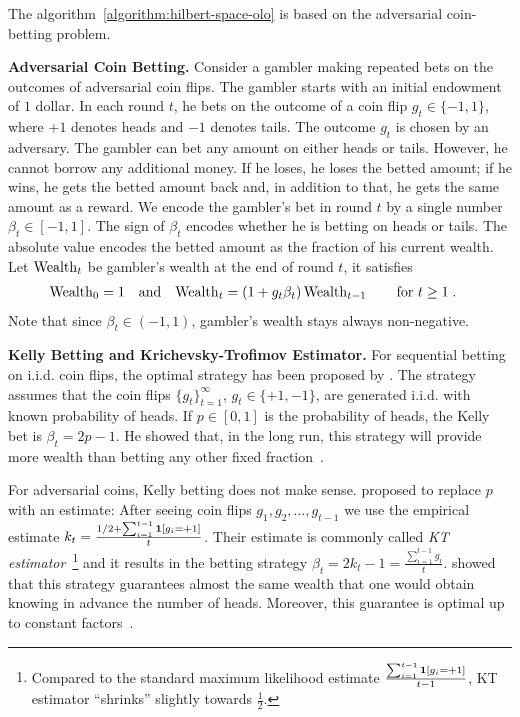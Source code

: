 
The algorithm~\ref{algorithm:hilbert-space-olo} is based on the adversarial coin-betting problem.

\textbf{Adversarial Coin Betting.}
Consider a gambler making
repeated bets on the outcomes of adversarial coin flips. The gambler starts with an
initial endowment of $1$ dollar. In each round $t$, he bets on the outcome of a
coin flip $g_t \in \{-1,1\}$, where $+1$ denotes heads and $-1$ denotes tails.
The outcome $g_t$ is chosen by an adversary.
The gambler can bet any amount on either heads or tails. However, he cannot borrow
any additional money. If he loses, he loses the betted
amount; if he wins, he gets the betted amount back and, in addition to that, he
gets the same amount as a reward.  We encode the gambler's bet in round $t$ by a
single number $\beta_t \in [-1,1]$. The sign of $\beta_t$ encodes whether he is
betting on heads or tails. The absolute value encodes the betted amount as the
fraction of his current wealth.
Let $\operatorname{Wealth}_t$ be gambler's wealth at the end of round $t$, it satisfies
\begin{align}
\label{equation:wealth-recurrence}
\operatorname{Wealth}_0 & = 1 &
& \text{and} &
\operatorname{Wealth}_t & = (1 + g_t \beta_t) \operatorname{Wealth}_{t-1} \qquad \text{for $t \ge 1$} \; .
\end{align}
Note that since $\beta_t \in (-1,1)$, gambler's wealth stays always non-negative.

\textbf{Kelly Betting and Krichevsky-Trofimov Estimator.}
For sequential betting on i.i.d. coin flips, the optimal strategy has been proposed by \citet{Kelly-1956}.
The strategy assumes that the coin flips $\{g_t\}_{t=1}^\infty$, $g_t
\in \{+1,-1\}$, are generated i.i.d. with known probability of heads. If $p \in
[0,1]$ is the probability of heads, the Kelly bet is $\beta_t = 2p - 1$. He
showed that, in the long run, this strategy will provide more wealth than
betting any other fixed fraction~\cite{Kelly-1956}.

For adversarial coins, Kelly betting does not make sense.
\citet{Krichevsky-Trofimov-1981} proposed to replace $p$ with an estimate:
After seeing coin flips
$g_1, g_2, \dots, g_{t-1}$ we use the empirical estimate $k_t = \frac{1/2 +
\sum_{i=1}^{t-1} \mathbf{1}[g_i = +1]}{t}$. Their
estimate is commonly called \emph{KT estimator}~\footnote{Compared to the
standard maximum likelihood estimate $\frac{\sum_{i=1}^{t-1} \mathbf{1}[g_i =
+1]}{t-1}$, KT estimator ``shrinks'' slightly towards $\frac{1}{2}$.}
and it results in the betting strategy $\beta_t = 2k_t - 1 = \tfrac{\sum_{i=1}^{t-1} g_i}{t}$.
\citeauthor{Krichevsky-Trofimov-1981} showed that this strategy guarantees almost the same wealth that one would obtain knowing in advance the number of heads. Moreover, this guarantee is optimal up to constant
factors~\citep{Cesa-Bianchi-Lugosi-2006}.

